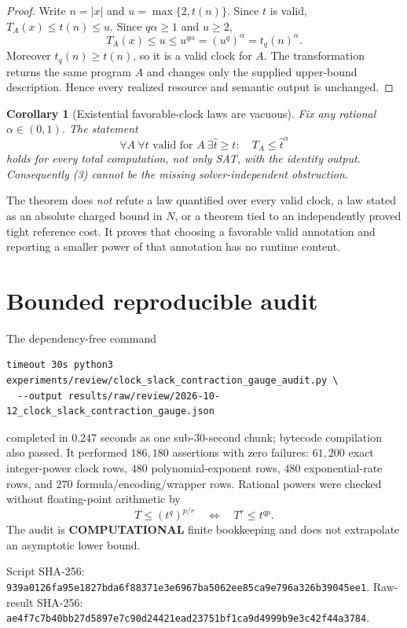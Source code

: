 \documentclass[11pt]{article}
\newtheorem{corollary}[theorem]{Corollary}
\newcommand{\COMP}{\textbf{COMPUTATIONAL}}
\begin{document}
\begin{proof}
Write $n=|x|$ and $u=\max\{2,t(n)\}$.  Since $t$ is valid,
$T_A(x)\le t(n)\le u$.  Since $q\alpha\ge1$ and $u\ge2$,
\[
 T_A(x)\le u\le u^{q\alpha}=(u^q)^\alpha=t_q(n)^\alpha.
\]
Moreover $t_q(n)\ge t(n)$, so it is a valid clock for $A$.  The
transformation returns the same program $A$ and changes only the supplied
upper-bound description.  Hence every realized resource and semantic output
is unchanged.
\end{proof}

\begin{corollary}[Existential favorable-clock laws are vacuous]
Fix any rational $\alpha\in(0,1)$.  The statement
\[
 \forall A\ \forall t\text{ valid for }A\ \exists\widehat t\ge t:\quad
 T_A\le \widehat t^{\alpha} \tag{3}
\]
holds for every total computation, not only SAT, with the identity output.
Consequently (3) cannot be the missing solver-independent obstruction.
\end{corollary}

The theorem does \emph{not} refute a law quantified over every valid clock,
a law stated as an absolute charged bound in $N$, or a theorem tied to an
independently proved tight reference cost.  It proves that choosing a
favorable valid annotation and reporting a smaller power of that annotation
has no runtime content.

\section{Bounded reproducible audit}

The dependency-free command
\begin{verbatim}
timeout 30s python3 experiments/review/clock_slack_contraction_gauge_audit.py \
  --output results/raw/review/2026-10-12_clock_slack_contraction_gauge.json
\end{verbatim}
completed in $0.247$ seconds as one sub-30-second chunk; bytecode compilation
also passed.  It performed $186{,}180$ assertions with zero failures:
$61{,}200$ exact integer-power clock rows, $480$ polynomial-exponent rows,
$480$ exponential-rate rows, and $270$ formula/encoding/wrapper rows.
Rational powers were checked without floating-point arithmetic by
\[
 T\le (t^q)^{p/r}\quad\Longleftrightarrow\quad T^r\le t^{qp}.
\]
The audit is \COMP{} finite bookkeeping and does not extrapolate an
asymptotic lower bound.

Script SHA-256:
\nolinkurl{939a0126fa95e1827bda6f88371e3e6967ba5062ee85ca9e796a326b39045ee1}.
Raw-result SHA-256:
\nolinkurl{ae4f7c7b40bb27d5897e7c90d24421ead23751bf1ca9d4999b9e3c42f44a3784}.
\end{document}
